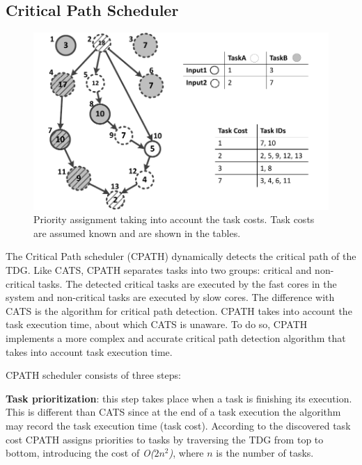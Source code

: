 \subsection{Critical Path Scheduler}
\label{sec.cpath}
\begin{figure}[tr]
\includegraphics[width=\columnwidth]{images/cpath_priorities.pdf} 
\centering
\caption{Priority assignment taking into account the task costs. Task costs are assumed known and are shown in the tables.}
\label{cpath}
\vspace{-0.5cm}
\end{figure}


The Critical Path scheduler (CPATH) dynamically detects the critical path of the TDG.
Like CATS, CPATH separates tasks into two groups: critical and non-critical tasks.
The detected critical tasks are executed by the fast cores in the system and non-critical tasks are executed by slow cores.
The difference with CATS is the algorithm for critical path detection.
CPATH takes into account the task execution time, about which CATS is unaware.
To do so, CPATH implements a more complex and accurate critical path detection algorithm that takes into account task execution time.

CPATH scheduler consists of three steps:

\textbf{Task prioritization}: this step takes place when a task is finishing its execution. This is different than CATS since at the end of a task execution the algorithm may record the task execution time (task cost).
According to the discovered task cost CPATH assigns priorities to tasks by traversing the TDG from top to bottom, introducing the cost of \textit{O($2n^2$)}, where \textit{$n$} is the number of tasks.

